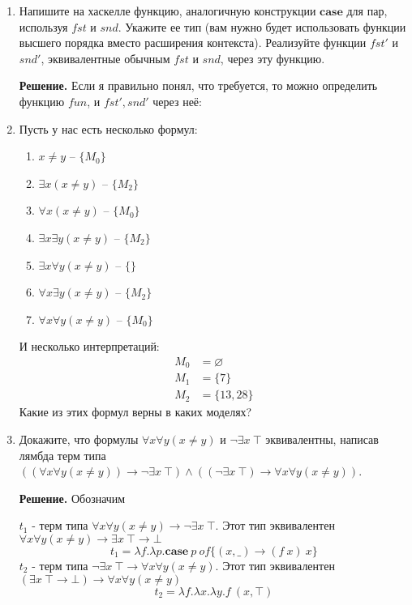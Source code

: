 \begin{enumerate}
\item Напишите на хаскелле функцию, аналогичную конструкции $\mathbf{case}$ для пар, используя $fst$ и $snd$.
    Укажите ее тип (вам нужно будет использовать функции высшего порядка вместо расширения контекста).
    Реализуйте функции $fst'$ и $snd'$, эквивалентные обычным $fst$ и $snd$, через эту функцию.

\textbf{Решение.} Если я правильно понял, что требуется, то можно определить функцию $fun$, и $fst', snd'$ через неё:




\item Пусть у нас есть несколько формул:
\begin{enumerate}
\item \label{it:no} $x \neq y$ -- $\{M_0\}$
\item \label{it:e} $\exists x (x \neq y)$ -- $\{M_2\}$
\item \label{it:a} $\forall x (x \neq y)$ -- $\{M_0\}$
\item \label{it:ee} $\exists x \exists y (x \neq y)$ -- $\{M_2\}$
\item \label{it:ea} $\exists x \forall y (x \neq y)$ -- $\{\}$
\item \label{it:ae} $\forall x \exists y (x \neq y)$ -- $\{M_2\}$
\item \label{it:aa} $\forall x \forall y (x \neq y)$ -- $\{M_0\}$
\end{enumerate}
И несколько интерпретаций:
\begin{align*}
M_0 & = \varnothing \\
M_1 & = \{ 7 \} \\
M_2 & = \{ 13, 28 \}
\end{align*}
Какие из этих формул верны в каких моделях?

\item Докажите, что формулы $\forall x \forall y (x \neq y)$ и $\neg \exists x\ \top$ эквивалентны,
    написав лямбда терм типа $((\forall x \forall y (x \neq y)) \to \neg \exists x\ \top) \land ((\neg \exists x\ 
    \top) \to \forall x \forall y (x \neq y))$.
    
\textbf{Решение.} Обозначим 

$t_1$ - терм типа $\forall x \forall y (x \neq y) \to \neg \exists x\ \top$. Этот тип эквивалентен $\forall x \forall y (x \neq y) \to \exists x\ \top \to \bot$ 
\begin{equation*}
	t_1 = \lambda f.\lambda p. \mathbf{case}\ p \ of \{ (x, \_ ) \to (f \ x)\ x \} 
\end{equation*}
$t_2$ - терм типа $\neg \exists x\ \top \to \forall x \forall y (x \neq y)$. Этот тип эквивалентен $(\exists x\ \top \to \bot) \to \forall x \forall y (x \neq y)$
\begin{equation*}
	t_2 = \lambda f. \lambda x. \lambda y. f\ (x, \top)
\end{equation*}


\end{enumerate}
